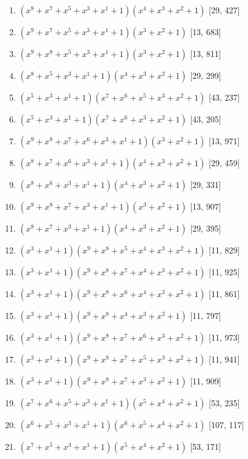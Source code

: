 \documentclass[10pt,twocolumn]{article}
\begin{document}
\begin{enumerate}
\item $(x^{8} + x^{7} + x^{5} + x^{3} + x^{1} + 1)(x^{4} + x^{3} + x^{2} + 1)$  [29, 427]
\item $(x^{9} + x^{7} + x^{5} + x^{3} + x^{1} + 1)(x^{3} + x^{2} + 1)$  [13, 683]
\item $(x^{9} + x^{8} + x^{5} + x^{3} + x^{1} + 1)(x^{3} + x^{2} + 1)$  [13, 811]
\item $(x^{8} + x^{5} + x^{3} + x^{1} + 1)(x^{4} + x^{3} + x^{2} + 1)$  [29, 299]
\item $(x^{5} + x^{3} + x^{1} + 1)(x^{7} + x^{6} + x^{5} + x^{3} + x^{2} + 1)$  [43, 237]
\item $(x^{5} + x^{3} + x^{1} + 1)(x^{7} + x^{6} + x^{3} + x^{2} + 1)$  [43, 205]
\item $(x^{9} + x^{8} + x^{7} + x^{6} + x^{3} + x^{1} + 1)(x^{3} + x^{2} + 1)$  [13, 971]
\item $(x^{8} + x^{7} + x^{6} + x^{3} + x^{1} + 1)(x^{4} + x^{3} + x^{2} + 1)$  [29, 459]
\item $(x^{8} + x^{6} + x^{3} + x^{1} + 1)(x^{4} + x^{3} + x^{2} + 1)$  [29, 331]
\item $(x^{9} + x^{8} + x^{7} + x^{3} + x^{1} + 1)(x^{3} + x^{2} + 1)$  [13, 907]
\item $(x^{8} + x^{7} + x^{3} + x^{1} + 1)(x^{4} + x^{3} + x^{2} + 1)$  [29, 395]
\item $(x^{3} + x^{1} + 1)(x^{9} + x^{8} + x^{5} + x^{4} + x^{3} + x^{2} + 1)$  [11, 829]
\item $(x^{3} + x^{1} + 1)(x^{9} + x^{8} + x^{7} + x^{4} + x^{3} + x^{2} + 1)$  [11, 925]
\item $(x^{3} + x^{1} + 1)(x^{9} + x^{8} + x^{6} + x^{4} + x^{3} + x^{2} + 1)$  [11, 861]
\item $(x^{3} + x^{1} + 1)(x^{9} + x^{8} + x^{4} + x^{3} + x^{2} + 1)$  [11, 797]
\item $(x^{3} + x^{1} + 1)(x^{9} + x^{8} + x^{7} + x^{6} + x^{3} + x^{2} + 1)$  [11, 973]
\item $(x^{3} + x^{1} + 1)(x^{9} + x^{8} + x^{7} + x^{5} + x^{3} + x^{2} + 1)$  [11, 941]
\item $(x^{3} + x^{1} + 1)(x^{9} + x^{8} + x^{7} + x^{3} + x^{2} + 1)$  [11, 909]
\item $(x^{7} + x^{6} + x^{5} + x^{3} + x^{1} + 1)(x^{5} + x^{4} + x^{2} + 1)$  [53, 235]
\item $(x^{6} + x^{5} + x^{3} + x^{1} + 1)(x^{6} + x^{5} + x^{4} + x^{2} + 1)$  [107, 117]
\item $(x^{7} + x^{5} + x^{3} + x^{1} + 1)(x^{5} + x^{4} + x^{2} + 1)$  [53, 171]

\end{enumerate}
\end{document}

